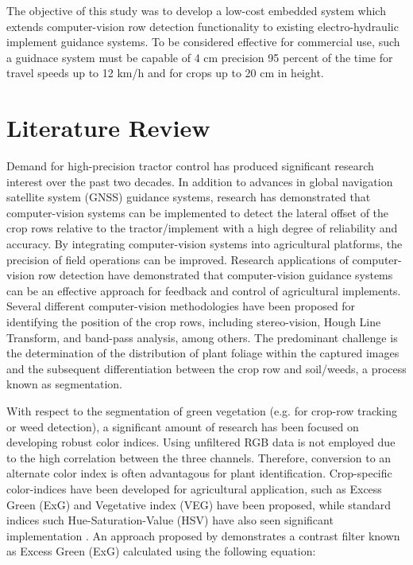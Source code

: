 \documentclass[authoryear]{elsarticle}
\begin{document}
The objective of this study was to develop a low-cost embedded system
which extends computer-vision row detection functionality to existing
electro-hydraulic implement guidance systems. To be considered
effective for commercial use, such a guidnace system must be capable
of 4 cm precision 95 percent of the  time for travel speeds up to 12
km/h and for crops up to 20 cm in height.

\section{Literature Review}
Demand for high-precision tractor control has produced significant
research interest over the past two decades. In addition to advances
in global navigation satellite system (GNSS) guidance systems,
research has demonstrated that computer-vision systems can be
implemented to detect the lateral offset of the crop rows relative to
the tractor/implement with a high degree of reliability and accuracy.
By integrating computer-vision systems into agricultural platforms,
the precision of field operations can be improved. Research applications of
computer-vision row detection have demonstrated that computer-vision
guidance systems can be an effective approach for feedback and
control of agricultural implements. Several different computer-vision
methodologies have been proposed for identifying the position of the
crop rows, including stereo-vision, Hough Line Transform, and band-pass
analysis, among others. The predominant challenge is the
determination of the distribution of plant foliage within the
captured images and the subsequent differentiation between the crop
row and soil/weeds, a process known as segmentation.

With respect to the segmentation of green vegetation (e.g. for
crop-row tracking or weed detection), a significant amount of research
has been focused on developing robust color indices. Using unfiltered
RGB data is not employed due to the high correlation between the three
channels. Therefore, conversion to an alternate color index is often
advantagous for plant identification. Crop-specific color-indices have
been developed for agricultural application, such as Excess Green
(ExG) \citet{woebbecke1995} and Vegetative index (VEG)
\citep{hague2006} have been proposed, while standard indices such
Hue-Saturation-Value (HSV) have also seen significant implementation
\citep{moorthy2015}. An approach proposed by \citet{meyer1998}
demonstrates a contrast filter known as Excess Green (ExG) calculated
using the following equation:  
\end{document}
